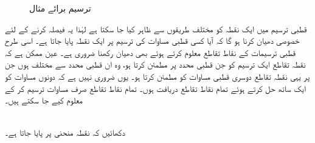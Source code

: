 \begin{figure}
\begin{subfigure}{0.30\textwidth}
\caption{}
\end{subfigure}
\caption{ترسیم برائے مثال }
\label{شکل_مثال_مخروط_کارتیسی_قطبی_ب}
\end{figure}



قطبی ترسیم میں ایک نقطہ کو مختلف طریقوں سے ظاہر کیا جا سکتا ہے لہٰذا یہ فیصلہ کرنے کے لئے خصوصی دھیان کرنا ہو گا کہ آیا کسی قطبی مساوات  کی ترسیم پر ایک  نقطہ پایا جاتا ہے۔ اسی طرح قطبی ترسیمات کے نقاط تقاطع معلوم کرتے ہوئے بھی دھیان رکھنا ضروری ہے۔  عین ممکن ہے کہ نقطہ تقاطع ایک ترسیم کو جن  قطبی محدد پر مطمئن کرتا ہو، وہ ان قطبی محدد سے مختلف ہوں جن پر یہی نقطہ تقاطع دوسری قطبی مساوات کو مطمئن کرتا ہو۔ یوں ضروری نہیں ہے کہ دونوں مساوات کو ایک ساتھ حل کرتے ہوئے تمام نقاط تقاطع دریافت ہوں۔  تمام نقاط تقاطع صرف مساوات  ترسیم کر کے معلوم کیے جا سکتے ہیں۔ 

\\
دکھائیں کہ نقطہ  منحنی  پر پایا جاتا ہے۔

